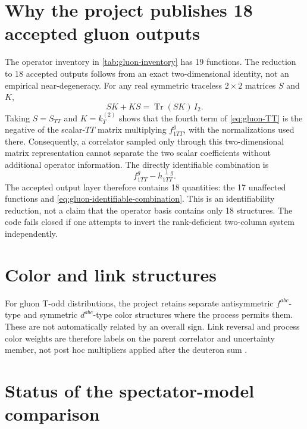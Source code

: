 \documentclass[11pt,oneside]{book}
\newcommand{\Tr}{\operatorname{Tr}}
\begin{document}
\section{Why the project publishes 18 accepted gluon outputs}
\label{sec:19-to-18}

The operator inventory in \cref{tab:gluon-inventory} has 19 functions.  The reduction to 18 accepted outputs follows from an exact two-dimensional identity, not an empirical near-degeneracy.  For any real symmetric traceless $2\times2$ matrices $S$ and $K$,
\begin{equation}
 SK+KS=\Tr(SK)\,I_2.
 \label{eq:2d-stf-product-identity}
\end{equation}
Taking $S=S_{TT}$ and $K=k_T^{(2)}$ shows that the fourth term of \cref{eq:gluon-TT} is the negative of the scalar-$TT$ matrix multiplying $f_{1TT}^g$, with the normalizations used there.  Consequently, a correlator sampled only through this two-dimensional matrix representation cannot separate the two scalar coefficients without additional operator information.  The directly identifiable combination is
\begin{equation}
 f_{1TT}^g-h_{1TT}^{\perp g}.
 \label{eq:gluon-identifiable-combination}
\end{equation}
The accepted output layer therefore contains 18 quantities: the 17 unaffected functions and \cref{eq:gluon-identifiable-combination}.  This is an identifiability reduction, not a claim that the operator basis contains only 18 structures.  The code fails closed if one attempts to invert the rank-deficient two-column system independently.

\section{Color and link structures}

For gluon T-odd distributions, the project retains separate antisymmetric $f^{abc}$-type and symmetric $d^{abc}$-type color structures where the process permits them.  These are not automatically related by an overall sign.  Link reversal and process color weights are therefore labels on the parent correlator and uncertainty member, not post hoc multipliers applied after the deuteron sum \cite{BoerEtAl2016,BuffingMukherjeeMulders2013}.

\section{Status of the spectator-model comparison}
\end{document}
